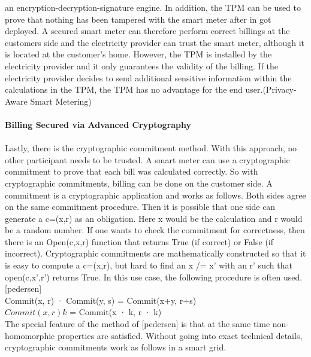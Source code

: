an encryption-decryption-signature engine. In addition, the TPM can be used to prove that nothing has been tampered with the smart meter after in got deployed. A secured smart meter can therefore perform correct billings at the customers side and the electricity provider can trust the smart meter, although it is located at the customer's home. However, the TPM is installed by the electricity provider and it only guarantees the validity of the billing. If the electricity provider decides to send additional sensitive information within the calculations in the TPM, the TPM has no advantage for the end user.(Privacy-Aware Smart Metering)\\
\\
\textbf{Billing Secured via Advanced Cryptography}
\\
\\
Lastly, there is the cryptographic commitment method.
With this approach, no other participant needs to be trusted. A smart meter can use a cryptographic commitment to prove that each bill was calculated correctly. So with cryptographic commitments, billing can be done on the customer side. A commitment is a cryptographic application and works as follows. Both sides agree on the same commitment procedure. Then it is possible that one side can generate a c=(x,r) as an obligation. Here x would be the calculation and r would be a random number. If one wants to check the commitment for correctness, then there is an Open(c,x,r) function that returns True (if correct) or False (if incorrect).
Cryptographic commitments are mathematically constructed so that it is easy to compute a c=(x,r), but hard to find an x /= x' with an r' such that open(c,x',r') returns True. In this use case, the following procedure is often used. [pedersen] \\
Commit(x, r) · Commit(y, s) = Commit(x+y, r+s)\\
$Commit(x, r){k}$ = Commit(x · k, r · k)\\
The special feature of the method of [pedersen] is that at the same time non-homomorphic properties are satisfied. Without going into exact technical details, cryptographic commitments work as follows in a smart grid.\\
